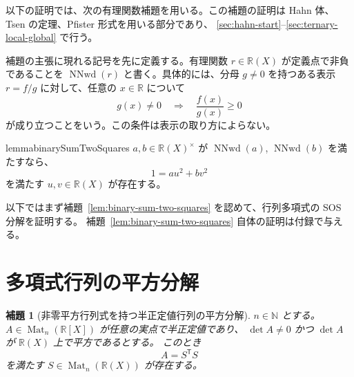 \documentclass[uplatex,dvipdfmx]{jsarticle}
\newcommand{\Poly}{\mathbb{R}[X]}
\newcommand{\Frac}{\mathbb{R}(X)}
\newcommand{\Mat}{\operatorname{Mat}}
\newcommand{\NNwd}{\operatorname{NNwd}}
\theoremstyle{matrixsosdefinition}
\newtheorem{lemma}[theorem]{補題}
\begin{document}
以下の証明では、次の有理関数補題を用いる。この補題の証明は
Hahn 体、Tsen の定理、Pfister 形式を用いる部分であり、
\ref{sec:hahn-start}--\ref{sec:ternary-local-global} で行う。

補題の主張に現れる記号を先に定義する。有理関数 \(r\in\Frac\) が定義点で非負であることを
\(\NNwd(r)\) と書く。具体的には、分母 \(g\ne0\) を持つある表示 \(r=f/g\) に対して、任意の
\(x\in\mathbb{R}\) について
\[
  g(x)\ne0 \quad\Longrightarrow\quad \frac{f(x)}{g(x)}\ge0
\]
が成り立つことをいう。この条件は表示の取り方によらない。

\begin{restatable}[二項平方和表示]{lemma}{binarySumTwoSquares}\label{lem:binary-sum-two-squares}
  \(a,b\in\Frac^\times\) が \(\NNwd(a)\), \(\NNwd(b)\) を満たすなら、
  \[
    1=a u^2+b v^2
  \]
  を満たす \(u,v\in\Frac\) が存在する。
\end{restatable}

以下ではまず補題~\ref{lem:binary-sum-two-squares} を認めて、行列多項式の SOS 分解を証明する。
補題~\ref{lem:binary-sum-two-squares} 自体の証明は付録で与える。

\section{多項式行列の平方分解}\label{sec:matrix-factorization}

\begin{lemma}[非零平方行列式を持つ半正定値行列の平方分解]
\label{lem:square-det-psd-rational-factorization}
  \(n\in\mathbb{N}\) とする。
  \(A\in\Mat_n(\Poly)\) が任意の実点で半正定値であり、
  \(\det A\ne0\) かつ \(\det A\) が \(\Frac\) 上で平方であるとする。
  このとき
  \[
    A=S^{\mathsf T}S
  \]
  を満たす \(S\in\Mat_n(\Frac)\) が存在する。
\end{lemma}
\end{document}
